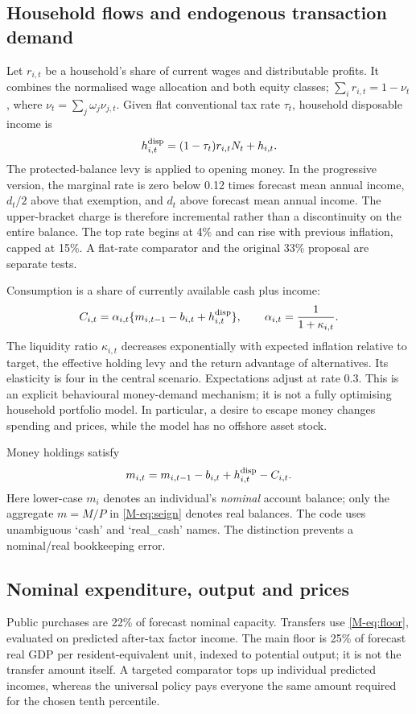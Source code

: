 \subsection{Household flows and endogenous transaction demand}
Let $r_{i,t}$ be a household's share of current wages and distributable profits. It combines the normalised wage allocation and both equity classes; $\sum_i r_{i,t}=1-\nu_t$, where $\nu_t=\sum_j\omega_j\nu_{j,t}$. Given flat conventional tax rate $\tau_t$, household disposable income is
\begin{equation}
h^{\rm disp}_{i,t}=(1-\tau_t)r_{i,t}N_t+h_{i,t}.
\end{equation}
The protected-balance levy is applied to opening money. In the progressive version, the marginal rate is zero below 0.12 times forecast mean annual income, $d_t/2$ above that exemption, and $d_t$ above forecast mean annual income. The upper-bracket charge is therefore incremental rather than a discontinuity on the entire balance. The top rate begins at 4\% and can rise with previous inflation, capped at 15\%. A flat-rate comparator and the original 33\% proposal are separate tests.

Consumption is a share of currently available cash plus income:
\begin{equation}
C_{i,t}=\alpha_{i,t}\{m_{i,t-1}-b_{i,t}+h^{\rm disp}_{i,t}\},\qquad
\alpha_{i,t}=\frac{1}{1+\kappa_{i,t}}.\label{eq:cons}
\end{equation}
The liquidity ratio $\kappa_{i,t}$ decreases exponentially with expected inflation relative to target, the effective holding levy and the return advantage of alternatives. Its elasticity is four in the central scenario. Expectations adjust at rate 0.3. This is an explicit behavioural money-demand mechanism; it is not a fully optimising household portfolio model. In particular, a desire to escape money changes spending and prices, while the model has no offshore asset stock.

Money holdings satisfy
\begin{equation}
m_{i,t}=m_{i,t-1}-b_{i,t}+h^{\rm disp}_{i,t}-C_{i,t}.
\end{equation}
Here lower-case $m_i$ denotes an individual's \emph{nominal} account balance; only the aggregate $m=M/P$ in \eqref{M-eq:seign} denotes real balances. The code uses unambiguous `cash' and `real\_cash' names. The distinction prevents a nominal/real bookkeeping error.

\subsection{Nominal expenditure, output and prices}
Public purchases are 22\% of forecast nominal capacity. Transfers use \eqref{M-eq:floor}, evaluated on predicted after-tax factor income. The main floor is 25\% of forecast real GDP per resident-equivalent unit, indexed to potential output; it is not the transfer amount itself. A targeted comparator tops up individual predicted incomes, whereas the universal policy pays everyone the same amount required for the chosen tenth percentile.

